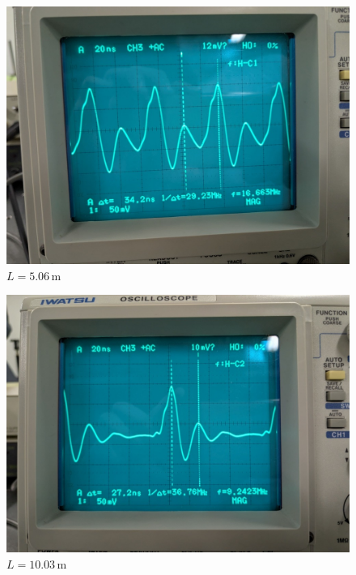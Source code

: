\documentclass{jarticle}
\begin{document}
\begin{figure}
  \begin{center}
    \includegraphics[scale=0.3]{cable3_result_picture.jpg}
    \caption{$L=5.06\,\mathrm{m}$}
  \end{center}
\end{figure}

\begin{figure}[H]
  \begin{center}
    \includegraphics[scale=0.3]{cable4_result_picture.jpg}
    \caption{$L=10.03\,\mathrm{m}$}
  \end{center}
\end{figure}
\end{document}
